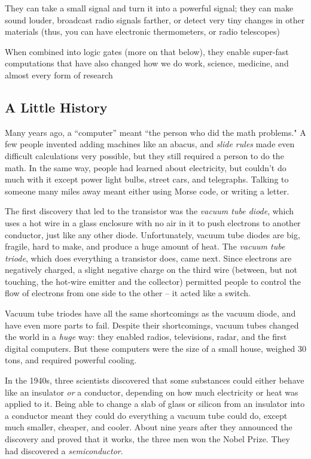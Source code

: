 \+ They can take a small signal and turn it into a powerful signal; they can make sound louder, broadcast radio signals farther, or detect very tiny changes in other materials (thus, you can have electronic thermometers, or radio telescopes)

\+ When combined into logic gates (more on that below), they enable super-fast computations that have also changed how we do work, science, medicine, and almost every form of research

\ei

\subsection*{A Little History}

Many years ago, a ``computer'' meant ``the person who did the math problems." A few people invented adding machines like an abacus, and \emph{slide rules} made even difficult calculations very possible, but they still required a person to do the math. In the same way, people had learned about electricity, but couldn't do much with it except power light bulbs, street cars, and telegraphs. Talking to someone many miles away meant either using Morse code, or writing a letter. 

The first discovery that led to the transistor was the \emph{vacuum tube diode}, which uses a hot wire in a glass enclosure with no air in it to push electrons to another conductor, just like any other diode. Unfortunately, vacuum tube diodes are big, fragile, hard to make, and produce a huge amount of heat. The \emph{vacuum tube triode}, which does everything a transistor does, came next. Since electrons are negatively charged, a slight negative charge on the third wire (between, but not touching, the hot-wire emitter and the collector) permitted people to control the flow of electrons from one side to the other -- it acted like a switch. 

Vacuum tube triodes have all the same shortcomings as the vacuum diode, and have even more parts to fail. Despite their shortcomings, vacuum tubes changed the world in a \emph{huge} way: they enabled radios, televisions, radar, and the first digital computers. But these computers were the size of a small house, weighed 30 tons, and required powerful cooling.

In the 1940s, three scientists discovered that some substances could either behave like an insulator \emph{or} a conductor, depending on how much electricity or heat was applied to it. Being able to change a slab of glass or silicon from an insulator into a conductor meant they could do everything a vacuum tube could do, except much smaller, cheaper, and cooler. About nine years after they announced the discovery and proved that it works, the three men won the Nobel Prize. They had discovered a \emph{semiconductor}. 

